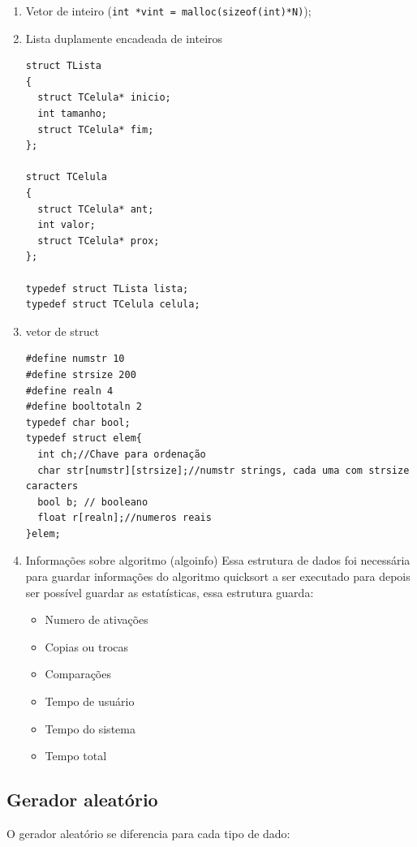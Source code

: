 \documentclass[11pt]{article}
\begin{document}
\begin{enumerate}
\item Vetor de inteiro (\texttt{int *vint = malloc(sizeof(int)*N)});

\item Lista duplamente encadeada de inteiros

\begin{verbatim}
struct TLista
{
  struct TCelula* inicio;
  int tamanho;
  struct TCelula* fim;
};

struct TCelula
{
  struct TCelula* ant;
  int valor;
  struct TCelula* prox;
};

typedef struct TLista lista;
typedef struct TCelula celula;
\end{verbatim}

\item vetor de struct

\begin{verbatim}
#define numstr 10
#define strsize 200
#define realn 4
#define booltotaln 2
typedef char bool;
typedef struct elem{
  int ch;//Chave para ordenação
  char str[numstr][strsize];//numstr strings, cada uma com strsize caracters
  bool b; // booleano
  float r[realn];//numeros reais
}elem;
\end{verbatim}

\item Informações sobre algoritmo (algoinfo)
Essa estrutura de dados foi necessária para guardar informações do algoritmo quicksort a ser executado para depois ser possível guardar as estatísticas, essa estrutura guarda:
\begin{itemize}
\item Numero de ativações
\item Copias ou trocas
\item Comparações
\item Tempo de usuário
\item Tempo do sistema
\item Tempo total
\end{itemize}
\end{enumerate}

\subsection{Gerador aleatório}
\label{sec:orgfd43170}
O gerador aleatório se diferencia para cada tipo de dado:
\end{document}
